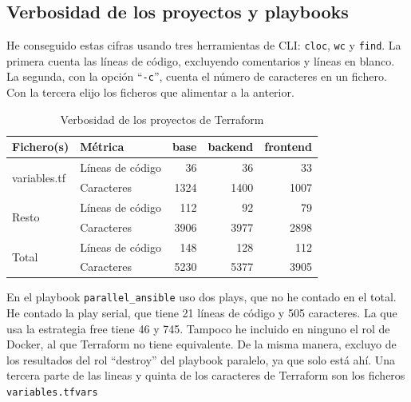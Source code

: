 \documentclass[11pt]{article}
\begin{document}
\begin{flushleft}
\clearpage
\section{Verbosidad de los proyectos y playbooks}
\label{anexo:verbosidad}

He conseguido estas cifras usando tres herramientas de CLI: \texttt{cloc}, \texttt{wc} y \texttt{find}. La primera cuenta las líneas de código, excluyendo comentarios y líneas en blanco. La segunda, con la opción ``\texttt{-c}'', cuenta el número de caracteres en un fichero. Con la tercera elijo los ficheros que alimentar a la anterior.
\linebreak

\begin{table}[h!]
    \centering
    \begin{tabular}{| l | l | r | r | r |}
        \hline
        \textbf{Fichero(s)}                 & \textbf{Métrica} & \textbf{base}   & \textbf{backend}  & \textbf{frontend}           \\
        \hline
        \hline
        
        \multirow{2}{*}{variables.tf}       & Líneas de código & 36              & 36                & 33                          \\
                                            & Caracteres       & 1324            & 1400              & 1007                        \\
        \hline
        \multirow{2}{*}{Resto}              & Líneas de código & 112             & 92                & 79                          \\
                                            & Caracteres       & 3906            & 3977              & 2898                        \\
        \hline
        \multirow{2}{*}{Total}              & Líneas de código & 148             & 128               & 112                         \\
                                            & Caracteres       & 5230            & 5377              & 3905                        \\
        \hline

    \end{tabular}
    \caption{Verbosidad de los proyectos de Terraform}
    \label{verbosidad_terraform}
\end{table}

\bigskip

En el playbook \texttt{parallel\_ansible} uso dos plays, que no he contado en el total. He contado la play serial, que tiene 21 líneas de código y 505 caracteres. La que usa la estrategia free tiene 46 y 745. Tampoco he incluido en ninguno el rol de Docker, al que Terraform no tiene equivalente. De la misma manera, excluyo de los resultados del rol ``destroy'' del playbook paralelo, ya que solo está ahí. Una tercera parte de las lineas y quinta de los caracteres de Terraform son los ficheros \texttt{variables.tfvars}
\linebreak


\end{flushleft}
\end{document}
